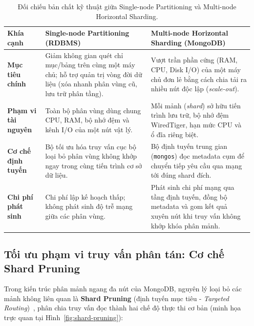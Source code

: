 \begin{table}[!htb]
\centering
\caption{Đối chiếu bản chất kỹ thuật giữa Single-node Partitioning và Multi-node Horizontal Sharding.}
\label{tab:part-vs-shard}
\renewcommand{\arraystretch}{1.22}
\begin{tabularx}{\linewidth}{L{2.8cm} X X}
\toprule
\textbf{Khía cạnh} & \textbf{Single-node Partitioning (RDBMS)} & \textbf{Multi-node Horizontal Sharding (MongoDB)} \\
\midrule
\textbf{Mục tiêu chính} & Giảm không gian quét chỉ mục/bảng trên cùng một máy chủ; hỗ trợ quản trị vòng đời dữ liệu (xóa nhanh phân vùng cũ, lưu trữ phân tầng). & Vượt trần phần cứng (RAM, CPU, Disk I/O) của một máy chủ đơn lẻ bằng cách chia tải ra nhiều nút độc lập (\textit{scale-out}). \\
\midrule
\textbf{Phạm vi tài nguyên} & Toàn bộ phân vùng dùng chung CPU, RAM, bộ nhớ đệm và kênh I/O của một nút vật lý. & Mỗi mảnh (\textit{shard}) sở hữu tiến trình lưu trữ, bộ nhớ đệm WiredTiger, hạn mức CPU và ổ đĩa riêng biệt. \\
\midrule
\textbf{Cơ chế định tuyến} & Bộ tối ưu hóa truy vấn cục bộ loại bỏ phân vùng không khớp ngay trong cùng tiến trình cơ sở dữ liệu. & Bộ định tuyến trung gian (\texttt{mongos}) đọc metadata cụm để chuyển tiếp yêu cầu qua mạng tới đúng shard đích. \\
\midrule
\textbf{Chi phí phát sinh} & Chi phí lập kế hoạch thấp; không phát sinh độ trễ mạng giữa các phân vùng. & Phát sinh chi phí mạng qua tầng định tuyến, đồng bộ metadata và gom kết quả xuyên nút khi truy vấn không khớp khóa phân mảnh. \\
\bottomrule
\end{tabularx}
\end{table}

\subsection{Tối ưu phạm vi truy vấn phân tán: Cơ chế Shard Pruning}

Trong kiến trúc phân mảnh ngang đa nút của MongoDB, nguyên lý loại bỏ các mảnh không liên quan là \textbf{Shard Pruning} (định tuyến mục tiêu - \textit{Targeted Routing})~\cite{MongoDBExplain}, phân chia truy vấn đọc thành hai chế độ thực thi cơ bản (minh họa trực quan tại Hình~\ref{fig:shard-pruning}):

